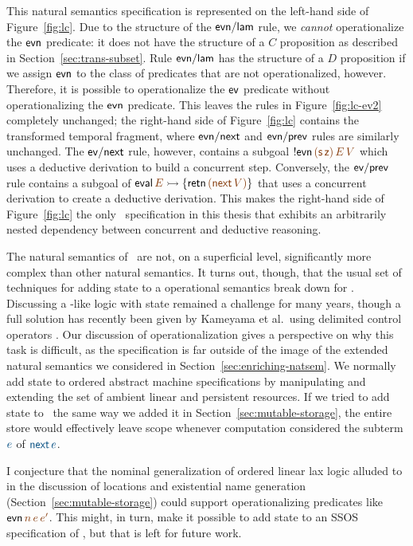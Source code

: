 This natural semantics specification is represented on the left-hand
side of Figure~\ref{fig:lc}. Due to the structure of the ${\sf
  evn/lam}$ rule, we {\it cannot} operationalize the ${\sf evn}$
predicate: it does not have the structure of a $C$ proposition as
described in Section~\ref{sec:trans-subset}. Rule ${\sf evn/lam}$ has 
the structure of a $D$ proposition if we assign ${\sf evn}$ to the 
class of predicates that are not operationalized, however.
Therefore, it is possible to
operationalize the ${\sf ev}$ predicate without operationalizing the
${\sf evn}$ predicate. This leaves the rules in
Figure~\ref{fig:lc-ev2} completely unchanged; the right-hand side of
Figure~\ref{fig:lc} contains the transformed temporal fragment,
where ${\sf evn/next}$ and ${\sf evn/prev}$ rules are similarly unchanged. 
The
${\sf ev/next}$ rule, however,
contains a subgoal ${!}{\sf evn}\,\lf{({\sf s}\,{\sf
  z})}\,\lf{E}\,\lf{V}$ which uses a deductive derivation to build a concurrent
step. Conversely, the ${\sf ev/prev}$ rule contains a subgoal of ${\sf
  eval}\,\lf{E} \lefti \{ {\sf retn}\,\lf{({\sf next}\,V)} \}$ that uses
a concurrent derivation to create a deductive derivation.  This makes the
right-hand side of Figure~\ref{fig:lc} the only \sls~specification in
this thesis that exhibits an arbitrarily nested dependency between
concurrent and deductive reasoning.

The natural semantics of \rowan~are not, on a superficial level,
significantly more complex than other natural semantics.  It turns out,
though,
that the usual set of techniques for adding state to a operational
semantics break down for \rowan. Discussing a \rowan-like logic with
state remained a challenge for many years, though a full solution has
recently been given by Kameyama et al.~using delimited control
operators \cite{kameyama11shifting}. Our discussion of
operationalization gives a perspective on why this task is difficult,
as the specification is far outside of the image of the extended
natural semantics we considered in Section~\ref{sec:enriching-natsem}.
We normally add state to ordered abstract machine specifications by
manipulating and extending the set of ambient linear and persistent
resources.  If we tried to add state to \rowan~the same way we added
it in Section~\ref{sec:mutable-storage}, the entire store would
effectively leave scope whenever computation considered the subterm
$\obj{e}$ of $\obj{{\sf next}\,e}$.

I conjecture that the nominal generalization of ordered linear lax
logic alluded to in the discussion of locations and existential name
generation (Section~\ref{sec:mutable-storage}) could support
operationalizing predicates like ${\sf
  evn}\,\lf{n}\,\lf{e}\,\lf{e'}$. This might, in turn, make it
possible to add state to an SSOS specification of \rowan, but that is
left for future work.
